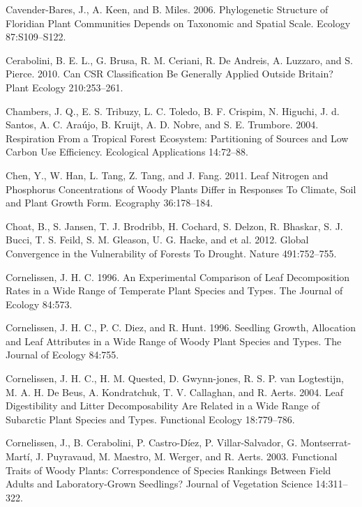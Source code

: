 \documentclass[11pt]{article}
\begin{document}
\begin{hangparas}{1.5em}{1}
\hypertarget{citeproc_bib_item_27}{Cavender-Bares, J., A. Keen, and B. Miles. 2006. Phylogenetic Structure of Floridian Plant Communities Depends on Taxonomic and Spatial Scale. Ecology 87:S109–S122.}

\hypertarget{citeproc_bib_item_28}{Cerabolini, B. E. L., G. Brusa, R. M. Ceriani, R. De Andreis, A. Luzzaro, and S. Pierce. 2010. Can CSR Classification Be Generally Applied Outside Britain? Plant Ecology 210:253–261.}

\hypertarget{citeproc_bib_item_29}{Chambers, J. Q., E. S. Tribuzy, L. C. Toledo, B. F. Crispim, N. Higuchi, J. d. Santos, A. C. Araújo, B. Kruijt, A. D. Nobre, and S. E. Trumbore. 2004. Respiration From a Tropical Forest Ecosystem: Partitioning of Sources and Low Carbon Use Efficiency. Ecological Applications 14:72–88.}

\hypertarget{citeproc_bib_item_30}{Chen, Y., W. Han, L. Tang, Z. Tang, and J. Fang. 2011. Leaf Nitrogen and Phosphorus Concentrations of Woody Plants Differ in Responses To Climate, Soil and Plant Growth Form. Ecography 36:178–184.}

\hypertarget{citeproc_bib_item_31}{Choat, B., S. Jansen, T. J. Brodribb, H. Cochard, S. Delzon, R. Bhaskar, S. J. Bucci, T. S. Feild, S. M. Gleason, U. G. Hacke, and et al. 2012. Global Convergence in the Vulnerability of Forests To Drought. Nature 491:752–755.}

\hypertarget{citeproc_bib_item_32}{Cornelissen, J. H. C. 1996. An Experimental Comparison of Leaf Decomposition Rates in a Wide Range of Temperate Plant Species and Types. The Journal of Ecology 84:573.}

\hypertarget{citeproc_bib_item_33}{Cornelissen, J. H. C., P. C. Diez, and R. Hunt. 1996. Seedling Growth, Allocation and Leaf Attributes in a Wide Range of Woody Plant Species and Types. The Journal of Ecology 84:755.}

\hypertarget{citeproc_bib_item_34}{Cornelissen, J. H. C., H. M. Quested, D. Gwynn-jones, R. S. P. van Logtestijn, M. A. H. De Beus, A. Kondratchuk, T. V. Callaghan, and R. Aerts. 2004. Leaf Digestibility and Litter Decomposability Are Related in a Wide Range of Subarctic Plant Species and Types. Functional Ecology 18:779–786.}

\hypertarget{citeproc_bib_item_35}{Cornelissen, J., B. Cerabolini, P. Castro-Díez, P. Villar-Salvador, G. Montserrat-Martí, J. Puyravaud, M. Maestro, M. Werger, and R. Aerts. 2003. Functional Traits of Woody Plants: Correspondence of Species Rankings Between Field Adults and Laboratory-Grown Seedlings? Journal of Vegetation Science 14:311–322.}


\end{hangparas}
\end{document}
